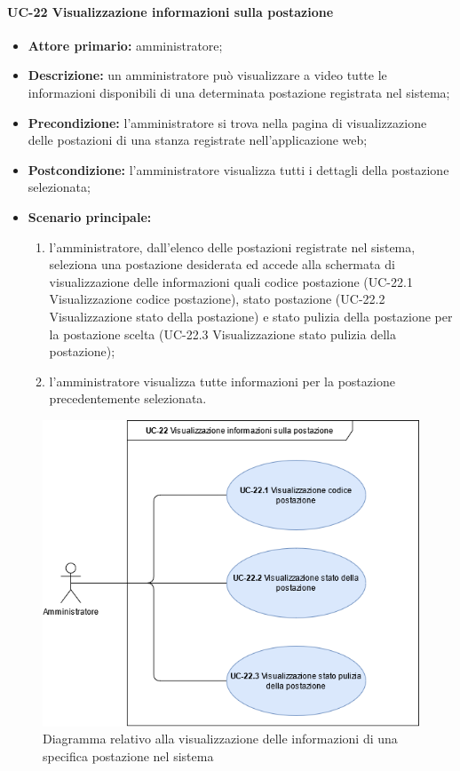 \paragraph{UC-22 Visualizzazione informazioni sulla postazione}
\begin{itemize}
    \item \textbf{Attore primario:} amministratore;
    \item \textbf{Descrizione:} un amministratore pu\`{o} visualizzare a video tutte le informazioni disponibili di una determinata postazione registrata nel sistema;
    \item \textbf{Precondizione:} l'amministratore si trova nella pagina di visualizzazione delle postazioni di una stanza registrate nell'applicazione web;
    \item \textbf{Postcondizione:} l'amministratore visualizza tutti i dettagli della postazione selezionata;
    \item \textbf{Scenario principale:}
    \begin{enumerate}
        \item l'amministratore, dall'elenco delle postazioni registrate nel sistema, seleziona una postazione desiderata ed accede alla schermata di visualizzazione delle informazioni quali codice postazione (UC-22.1 Visualizzazione codice postazione), stato postazione (UC-22.2 Visualizzazione stato della postazione) e stato pulizia della postazione per la postazione scelta (UC-22.3 Visualizzazione stato pulizia della postazione);
        \item l'amministratore visualizza tutte informazioni per la postazione precedentemente selezionata.
    \end{enumerate}
\end{itemize}

\begin{figure}[H]
    \centering
      \includegraphics[scale=0.50]{src/CasiDUso/immagini/InformazioniPostazione.png}
    \caption{Diagramma relativo alla visualizzazione delle informazioni di una specifica postazione nel sistema}
\end{figure}

